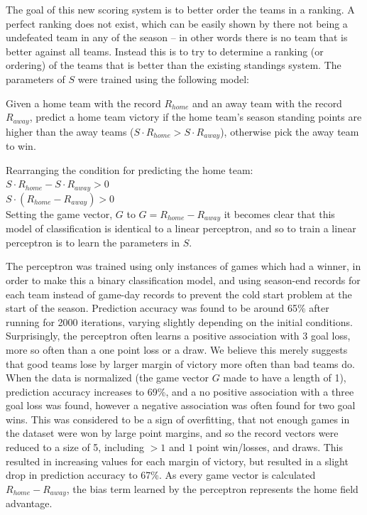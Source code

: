\documentclass[conference]{IEEEtran}
\begin{document}
The goal of this new scoring system is to better order the teams in a ranking. A perfect ranking does not exist, which can be easily shown by there not being a undefeated team in any of the season -- in other words there is no team that is better against all teams. Instead this is to try to determine a ranking (or ordering) of the teams that is better than the existing standings system. The parameters of $S$ were trained using the following model:

Given a home team with the record $R_{home}$ and an away team with the record $R_{away}$, predict a home team victory if the home team's season standing points are higher than the away teams ($S \cdot R_{home} > S \cdot R_{away}$), otherwise pick the away team to win.

Rearranging the condition for predicting the home team:\\$S \cdot R_{home} - S \cdot R_{away} > 0$\\
$S \cdot (R_{home} - R_{away} ) > 0 $\\
Setting the game vector, $G$ to $G = R_{home} - R_{away}$ it becomes clear that this model of classification is identical to a linear perceptron, and so to train a linear perceptron is to learn the parameters in $S$. 

The perceptron was trained using only instances of games which had a winner, in order to make this a binary classification model, and using season-end records for each team instead of game-day records to prevent the cold start problem at the start of the season. Prediction accuracy was found to be around 65\% after running for 2000 iterations, varying slightly depending on the initial conditions. Surprisingly, the perceptron often learns a positive association with 3 goal loss, more so often than a one point loss or a draw. We believe this merely suggests that good teams lose by larger margin of victory more often than bad teams do. When the data is normalized (the game vector $G$ made to have a length of 1), prediction accuracy increases to 69\%, and a no positive association with a three goal loss was found, however a negative association was often found for two goal wins. This was considered to be a sign of overfitting, that not enough games in the dataset were won by large point margins, and so the record vectors were reduced to a size of 5, including $>1$ and $1$ point win/losses, and draws. This resulted in increasing values for each margin of victory, but resulted in a slight drop in prediction accuracy to 67\%. As every game vector is calculated $R_{home} - R_{away}$, the bias term learned by the perceptron represents the home field advantage. 
\end{document}

